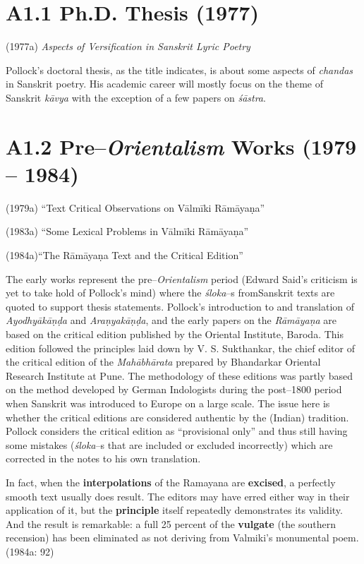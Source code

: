 \section*{A1.1 Ph.D. Thesis (1977)}

(1977a)\textit{ Aspects of Versification in Sanskrit Lyric Poetry}

Pollock’s doctoral thesis, as the title indicates, is about some aspects of \textit{chandas} in Sanskrit poetry. His academic career will mostly focus on the theme of Sanskrit \textit{kāvya} with the exception of a few papers on \textit{śāstra}.


\section*{A1.2 Pre–\textit{Orientalism} Works (1979 – 1984)}

(1979a) “Text Critical Observations on Vālmīki Rāmāyaṇa”

(1983a) “Some Lexical Problems in Vālmīki Rāmāyaṇa”

(1984a)“The Rāmāyaṇa Text and the Critical Edition”

The early works represent the pre–\textit{Orientalism} period (Edward Said’s criticism is yet to take hold of Pollock’s mind) where the \textit{śloka}–s fromSanskrit texts are quoted to support thesis statements. Pollock’s introduction to and translation of \textit{Ayodhyākāṇḍa} and \textit{Araṇyakāṇḍa}, and the early papers on the \textit{Rāmāyaṇa} are based on the critical edition published by the Oriental Institute, Baroda. This edition followed the principles laid down by V. S. Sukthankar, the chief editor of the critical edition of the \textit{Mahābhārata} prepared by Bhandarkar Oriental Research Institute at Pune. The methodology of these editions was partly based on the method developed by German Indologists during the post–1800 period when Sanskrit was introduced to Europe on a large scale. The issue here is whether the critical editions are considered authentic by the (Indian) tradition. Pollock considers the critical edition as “provisional only” and thus still having some mistakes (\textit{śloka}–s that are included or excluded incorrectly) which are corrected in the notes to his own translation.

\begin{myquote}
In fact, when the \textbf{interpolations} of the Ramayana are \textbf{excised}, a perfectly smooth text usually does result. The editors may have erred either way in their application of it, but the \textbf{principle} itself repeatedly demonstrates its validity. And the result is remarkable: a full 25 percent of the \textbf{vulgate} (the southern recension) has been eliminated as not deriving from Valmiki’s monumental poem. (1984a: 92)
\end{myquote}

